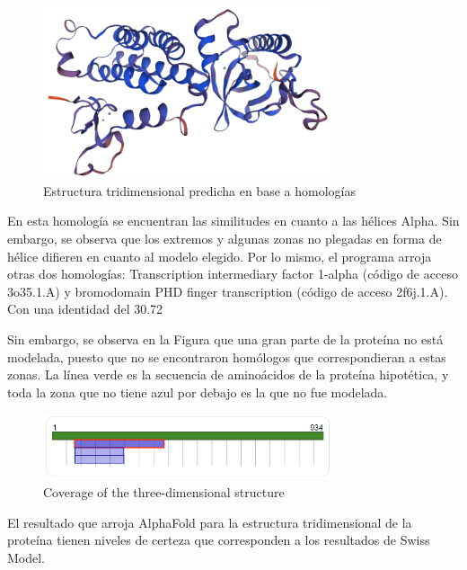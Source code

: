 \documentclass[journal,transmag]{IEEEtran}
\begin{document}
\begin{figure}[!h]
	\center
	\includegraphics[width=8.5cm]{imagenes/swiss.png}
	\caption{Estructura tridimensional predicha en base a homologías}
	\label{12}
\end{figure}
En esta homología se encuentran las similitudes en cuanto a las hélices Alpha. Sin embargo, se observa que los extremos y algunas zonas no plegadas en forma de hélice difieren en cuanto al modelo elegido. Por lo mismo, el programa arroja otras dos homologías: Transcription intermediary factor 1-alpha (código de acceso 3o35.1.A) y bromodomain PHD finger transcription (código de acceso 2f6j.1.A). Con una identidad del 30.72%

Sin embargo, se observa en la Figura que una gran parte de la proteína no está modelada, puesto que no se encontraron homólogos que correspondieran a estas zonas. La línea verde es la secuencia de aminoácidos de la proteína hipotética, y toda la zona que no tiene azul por debajo es la que no fue modelada.  

\begin{figure}[!h]
	\center
	\includegraphics[width=8.5cm]{imagenes/alpha1.png}
	\caption{Coverage of the three-dimensional structure}
	\label{13}
\end{figure}

El resultado que arroja AlphaFold para la estructura tridimensional de la proteína tienen niveles de certeza que corresponden a los resultados de Swiss Model.  
\end{document}
